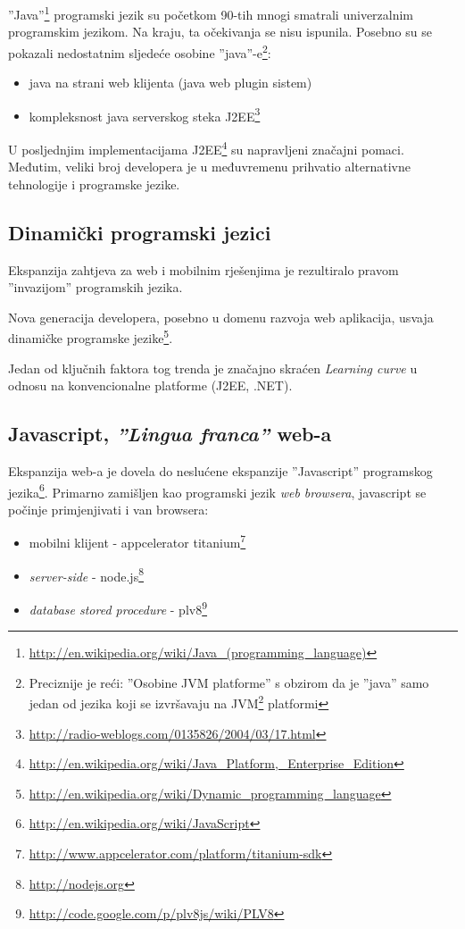 \documentclass[times, utf8, seminar]{fit}
\begin{document}
''Java''\footnote{\url{http://en.wikipedia.org/wiki/Java_(programming_language)}} programski jezik su početkom 90-tih mnogi smatrali univerzalnim programskim jezikom. Na kraju, ta očekivanja se nisu ispunila. Posebno su se pokazali nedostatnim sljedeće osobine ''java''-e\footnote{Preciznije je reći: ''Osobine JVM platforme'' s obzirom da je ''java'' samo jedan od jezika koji se izvršavaju na JVM\footnote{\url{http://en.wikipedia.org/wiki/Java_virtual_machine}} platformi}: 
\begin{itemize}
  \item java na strani web klijenta (java web plugin sistem)
  \item kompleksnost java serverskog steka J2EE\footnote{\url{http://radio-weblogs.com/0135826/2004/03/17.html}} 
\end{itemize}

U posljednjim implementacijama J2EE\footnote{\url{http://en.wikipedia.org/wiki/Java_Platform,_Enterprise_Edition}} su napravljeni značajni pomaci. Međutim, veliki broj developera je u međuvremenu prihvatio alternativne tehnologije i programske jezike.

\subsection{Dinamički programski jezici}
\label{sec:dynlang}
Ekspanzija zahtjeva za web i mobilnim rješenjima je rezultiralo pravom ''invazijom'' programskih jezika. 

Nova generacija developera, posebno u domenu razvoja web aplikacija, usvaja dinamičke programske jezike\footnote{\url{http://en.wikipedia.org/wiki/Dynamic_programming_language}}. 
 
Jedan od ključnih faktora tog trenda je značajno skraćen \emph{Learning curve} u odnosu na konvencionalne platforme (J2EE, .NET).

\subsection{Javascript, \emph{''Lingua franca''} web-a}
\label{sec:jslang}

Ekspanzija web-a je dovela do neslućene ekspanzije ''Javascript'' programskog jezika\footnote{\url{http://en.wikipedia.org/wiki/JavaScript}}. Primarno zamišljen kao programski jezik \emph{web browsera}, javascript se počinje primjenjivati i van browsera:
\begin{itemize}
  \item mobilni klijent - appcelerator titanium\footnote{\url{http://www.appcelerator.com/platform/titanium-sdk}}
  \item \emph{server-side} - node.js\footnote{\url{http://nodejs.org}}
  \item \emph{database stored procedure} - plv8\footnote{\url{http://code.google.com/p/plv8js/wiki/PLV8}}
\end{itemize}
 
\end{document}
